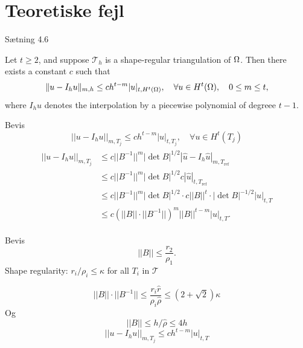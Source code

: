 \section{Teoretiske fejl}
\iffalse
\begin{frame}{Sætning 4.6}{}
    \begin{theorem}
    Let $t \geq 2$, and suppose $\mathcal{T}_h$ is a shape-regular triangulation of $\Omega$. Then there exists a constant $c$ such that
    \begin{equation}
        \|u - I_h u\| _{m,h} \leq c h^{t-m} |u|_{t, H^t(\Omega)}, \quad \forall u \in H^t(\Omega), \quad 0 \leq m \leq t,
    \end{equation}
    where $I_h u$ denotes the interpolation by a piecewise polynomial of degreee $t-1$.
    \end{theorem}
\end{frame}
\begin{frame}{Bevis}
    \begin{equation}
        ||u-I_h u||_{m,T_j} \leq c h^{t-m} |u|_{t,T_j}, \quad \forall u \in H^t(T_j)
    \end{equation}
    \begin{align}
        \begin{split}
        ||u-I_h u||_{m,T_j} &\leq c ||B^{-1}||^m |\det B |^{1/2} |\hat{u} - I_h \hat{u}|_{m,T_{\text{ref}}} \\
                            &\leq c ||B^{-1}||^m |\det B |^{1/2} c | \hat{u} |_{t,T_{\text{ref}}} \\
                            &\leq c ||B^{-1}||^m |\det B |^{1/2} \cdot c ||B||^t \cdot |\det B |^{-1/2} |u|_{t,T}  \\
                         &\leq c {\left( ||B||  \cdot ||B^{-1}|| \right)}^m ||B||^{t-m} |u|_{t,T}.
        \end{split}
    \end{align}
\end{frame}
\begin{frame}{Bevis}
\begin{equation}
    ||B|| \leq \frac{r_2}{\rho_1}.
\end{equation}
    Shape regularity: $r_i / \rho_i \leq \kappa$ for all $T_i$ in $\mathcal{T}$

    $$||B|| \cdot ||B^{-1}|| \leq \frac{r_i \hat{r}}{\rho_i \hat{\rho}} \leq \left( 2 + \sqrt{2} \right)\kappa$$
    Og
    $$||B|| \leq h/\hat{\rho}\leq 4h$$
    \begin{equation}
        ||u-I_h u||_{m,T_j} \leq c h^{t-m} |u|_{t,T}
    \end{equation}
\end{frame}
